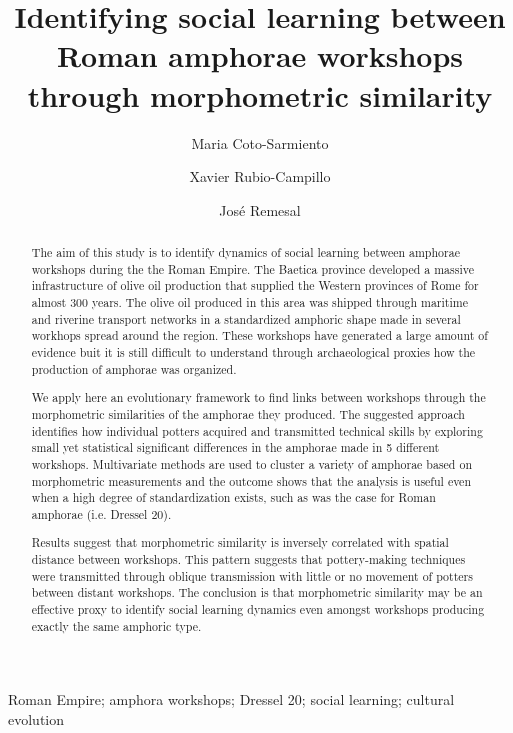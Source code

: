\documentclass[review]{elsarticle}
\begin{document}
\begin{frontmatter}

\title{Identifying social learning between Roman amphorae workshops through morphometric similarity}


\author[bscadress,ceipacadress]{Maria Coto-Sarmiento}


\author[edadress]{Xavier Rubio-Campillo}
\author[ceipacadress]{Jos\'e Remesal}


\address[bscadress]{Barcelona Supercomputing Center (BSC), Jordi Girona 29, Office 3A, Nexus II Building, 08034, Barcelona, Spain}
\address[edadress]{School of History, Classic \& Archaeology, Room OOM.33, William Robertson Wing, Old Medical School, Teviot Place, University of Edinburgh, UK}
\address[ceipacadress]{CEIPAC, Department of Prehistory and Archaeology, Montalegre, 6-8, 08001, University of Barcelona, Barcelona, Spain}

\begin{abstract}

The aim of this study is to identify dynamics of social learning between amphorae workshops during the the Roman Empire. The Baetica province developed a massive infrastructure of olive oil production that supplied the Western provinces of Rome for almost 300 years. The olive oil produced in this area was shipped through maritime and riverine transport networks in a standardized amphoric shape made in several workhops spread around the region. These workshops have generated a large amount of evidence buit it is still difficult to understand through archaeological proxies how the production of amphorae was organized.

We apply here an evolutionary framework to find links between workshops through the morphometric similarities of the amphorae they produced. The suggested approach identifies how individual potters acquired and transmitted technical skills by exploring small yet statistical significant differences in the amphorae made in 5 different workshops. Multivariate methods are used to cluster a variety of amphorae based on morphometric measurements and the outcome shows that the analysis is useful even when a high degree of standardization exists, such as was the case for Roman amphorae (i.e. Dressel 20).

Results suggest that morphometric similarity is inversely correlated with spatial distance between workshops. This pattern suggests that pottery-making techniques were transmitted through oblique transmission with little or no movement of potters between distant workshops. The conclusion is that morphometric similarity may be an effective proxy to identify social learning dynamics even amongst workshops producing exactly the same amphoric type. 

\end{abstract}


\begin{keyword}
Roman Empire; amphora workshops; Dressel 20; social learning; cultural evolution
\end{keyword}

\end{frontmatter}
\end{document}

